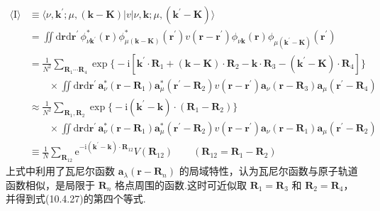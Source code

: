 \begin{equation}
\begin{aligned}
  \langle\mathrm{I}\rangle&\equiv\langle\nu,\boldsymbol{k}^{\prime};
  \mu,(\boldsymbol{k}-\boldsymbol{K})|v|\nu,\boldsymbol{k};
  \mu,(\boldsymbol{k}^{\prime}-\boldsymbol{K})\rangle\\
  &=\iint\mathrm{d}\boldsymbol{r}\mathrm{d}\boldsymbol{r}^{\prime}\,
  \phi_{\nu\boldsymbol{k}^{\prime}}^{*}(\boldsymbol{r})
  \phi_{\mu(\boldsymbol{k}-\boldsymbol{K})}^{*}(\boldsymbol{r}^{\prime})
  v(\boldsymbol{r}-\boldsymbol{r}^{\prime})
  \phi_{\nu\boldsymbol{k}}(\boldsymbol{r})
  \phi_{\mu(\boldsymbol{k}^{\prime}-\boldsymbol{K})}(\boldsymbol{r}^{\prime})\\
  &=\frac{1}{N^{2}}\sum_{\boldsymbol{R}_{1}\cdots\boldsymbol{R}_{4}}
  \exp\bigl\{-\mathrm{i}[\boldsymbol{k}^{\prime}\cdot\boldsymbol{R}_{1}
  +(\boldsymbol{k}-\boldsymbol{K})\cdot\boldsymbol{R}_{2}
  -\boldsymbol{k}\cdot\boldsymbol{R}_{3}
  -(\boldsymbol{k}^{\prime}-\boldsymbol{K})\cdot\boldsymbol{R}_{4}]\bigr\}\\
  &\qquad\times\iint\mathrm{d}\boldsymbol{r}\mathrm{d}\boldsymbol{r}^{\prime}\,
  \boldsymbol{a}_{\nu}^{*}(\boldsymbol{r}-\boldsymbol{R}_{1})
  \boldsymbol{a}_{\mu}^{*}(\boldsymbol{r}^{\prime}-\boldsymbol{R}_{2})
  v(\boldsymbol{r}-\boldsymbol{r}^{\prime})
  \boldsymbol{a}_{\nu}(\boldsymbol{r}-\boldsymbol{R}_{3})
  \boldsymbol{a}_{\mu}(\boldsymbol{r}^{\prime}-\boldsymbol{R}_{4})\\
  &\approx\frac{1}{N^{2}}\sum_{\boldsymbol{R}_{1},\boldsymbol{R}_{2}}
  \exp\bigl\{-\mathrm{i}(\boldsymbol{k}^{\prime}-\boldsymbol{k})
  \cdot(\boldsymbol{R}_{1}-\boldsymbol{R}_{2})\bigr\}\\
  &\qquad\times\iint\mathrm{d}\boldsymbol{r}\mathrm{d}\boldsymbol{r}^{\prime}\,
  \boldsymbol{a}_{\nu}^{*}(\boldsymbol{r}-\boldsymbol{R}_{1})
  \boldsymbol{a}_{\mu}^{*}(\boldsymbol{r}^{\prime}-\boldsymbol{R}_{2})
  v(\boldsymbol{r}-\boldsymbol{r}^{\prime})
  \boldsymbol{a}_{\nu}(\boldsymbol{r}-\boldsymbol{R}_{1})
  \boldsymbol{a}_{\mu}(\boldsymbol{r}^{\prime}-\boldsymbol{R}_{2})\\
  &\equiv\frac{1}{N}\sum_{\boldsymbol{R}_{12}}
  \mathrm{e}^{-\mathrm{i}(\boldsymbol{k}^{\prime}-\boldsymbol{k})\cdot\boldsymbol{R}_{12}}
  V(\boldsymbol{R}_{12})
  \qquad(\boldsymbol{R}_{12}=\boldsymbol{R}_{1}-\boldsymbol{R}_{2})
\end{aligned}
\end{equation}
上式中利用了瓦尼尔函数 $\boldsymbol{a}_{\lambda}(\boldsymbol{r}-\boldsymbol{R}_{n})$ 的局域特性，认为瓦尼尔函数与原子轨道函数相似，是局限于 $\boldsymbol{R}_{n}$ 格点周围的函数.这时可近似取 $\boldsymbol{R}_{1}=\boldsymbol{R}_{3}$ 和 $\boldsymbol{R}_{2}=\boldsymbol{R}_{4}$，并得到式(10.4.27)的第四个等式.

